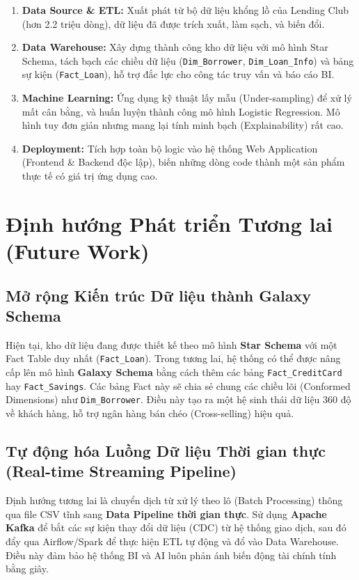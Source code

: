 \begin{enumerate}
    \item \textbf{Data Source \& ETL:} Xuất phát từ bộ dữ liệu khổng lồ của Lending Club (hơn 2.2 triệu dòng), dữ liệu đã được trích xuất, làm sạch, và biến đổi.
    \item \textbf{Data Warehouse:} Xây dựng thành công kho dữ liệu với mô hình Star Schema, tách bạch các chiều dữ liệu (\texttt{Dim\_Borrower}, \texttt{Dim\_Loan\_Info}) và bảng sự kiện (\texttt{Fact\_Loan}), hỗ trợ đắc lực cho công tác truy vấn và báo cáo BI.
    \item \textbf{Machine Learning:} Ứng dụng kỹ thuật lấy mẫu (Under-sampling) để xử lý mất cân bằng, và huấn luyện thành công mô hình Logistic Regression. Mô hình tuy đơn giản nhưng mang lại tính minh bạch (Explainability) rất cao.
    \item \textbf{Deployment:} Tích hợp toàn bộ logic vào hệ thống Web Application (Frontend \& Backend độc lập), biến những dòng code thành một sản phẩm thực tế có giá trị ứng dụng cao.
\end{enumerate}

\section{Định hướng Phát triển Tương lai (Future Work)}

\subsection{Mở rộng Kiến trúc Dữ liệu thành Galaxy Schema}
Hiện tại, kho dữ liệu đang được thiết kế theo mô hình \textbf{Star Schema} với một Fact Table duy nhất (\texttt{Fact\_Loan}). Trong tương lai, hệ thống có thể được nâng cấp lên mô hình \textbf{Galaxy Schema} bằng cách thêm các bảng \texttt{Fact\_CreditCard} hay \texttt{Fact\_Savings}. Các bảng Fact này sẽ chia sẻ chung các chiều lõi (Conformed Dimensions) như \texttt{Dim\_Borrower}. Điều này tạo ra một hệ sinh thái dữ liệu 360 độ về khách hàng, hỗ trợ ngân hàng bán chéo (Cross-selling) hiệu quả.

\subsection{Tự động hóa Luồng Dữ liệu Thời gian thực (Real-time Streaming Pipeline)}
Định hướng tương lai là chuyển dịch từ xử lý theo lô (Batch Processing) thông qua file CSV tĩnh sang \textbf{Data Pipeline thời gian thực}. Sử dụng \textbf{Apache Kafka} để bắt các sự kiện thay đổi dữ liệu (CDC) từ hệ thống giao dịch, sau đó đẩy qua Airflow/Spark để thực hiện ETL tự động và đổ vào Data Warehouse. Điều này đảm bảo hệ thống BI và AI luôn phản ánh biến động tài chính tính bằng giây.
